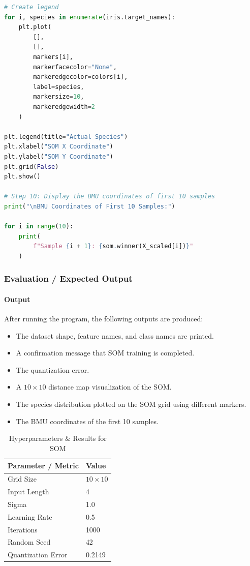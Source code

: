 \documentclass[a4paper,11pt]{article}
\begin{document}
\begin{itemize}
\begin{lstlisting}[language=Python, caption={SOM Implementation}]
# Create legend
for i, species in enumerate(iris.target_names):
    plt.plot(
        [],
        [],
        markers[i],
        markerfacecolor="None",
        markeredgecolor=colors[i],
        label=species,
        markersize=10,
        markeredgewidth=2
    )

plt.legend(title="Actual Species")
plt.xlabel("SOM X Coordinate")
plt.ylabel("SOM Y Coordinate")
plt.grid(False)
plt.show()

# Step 10: Display the BMU coordinates of first 10 samples
print("\nBMU Coordinates of First 10 Samples:")

for i in range(10):
    print(
        f"Sample {i + 1}: {som.winner(X_scaled[i])}"
    )
\end{lstlisting}

\subsubsection{Evaluation / Expected Output}

\paragraph{Output}
After running the program, the following outputs are produced:
\begin{itemize}
    \item The dataset shape, feature names, and class names are printed.
    \item A confirmation message that SOM training is completed.
    \item The quantization error.
    \item A $10 \times 10$ distance map visualization of the SOM.
    \item The species distribution plotted on the SOM grid using different markers.
    \item The BMU coordinates of the first 10 samples.
\end{itemize}

\begin{table}[H]
\centering
\caption{Hyperparameters \& Results for SOM}
\begin{tabular}{ll}
\toprule
\textbf{Parameter / Metric} & \textbf{Value} \\
\midrule
Grid Size          & $10 \times 10$ \\
Input Length       & 4 \\
Sigma              & 1.0 \\
Learning Rate      & 0.5 \\
Iterations         & 1000 \\
Random Seed        & 42 \\
Quantization Error & 0.2149 \\
\bottomrule
\end{tabular}
\end{table}


\end{itemize}
\end{document}
